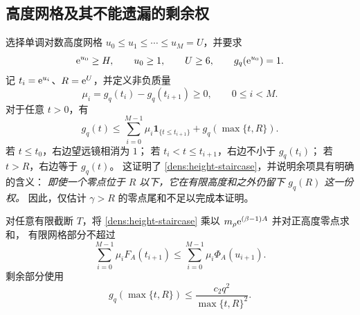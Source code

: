 \subsection{高度网格及其不能遗漏的剩余权}

选择单调对数高度网格
$u_0\leq u_1\leq\cdots\leq u_M=U$，并要求
\begin{equation}\label{dens:height-conditions}
 \mathrm e^{u_0}\geq H,\qquad u_0\geq1,\qquad U\geq6,\qquad
 g_q(\mathrm e^{u_0})=1.
\end{equation}
记 $t_i=\mathrm e^{u_i}$、$R=\mathrm e^U$，并定义非负质量
\begin{equation}\label{dens:mu}
 \mu_i=g_q(t_i)-g_q(t_{i+1})\geq0,\qquad 0\leq i<M.
\end{equation}
对于任意 $t>0$，有
\begin{equation}\label{dens:height-staircase}
 g_q(t)\leq
 \sum_{i=0}^{M-1}\mu_i\mathbf{1}_{\{t\leq t_{i+1}\}}
        +g_q(\max\{t,R\}).
\end{equation}
若 $t\leq t_0$，右边望远镜相消为 $1$；
若 $t_i<t\leq t_{i+1}$，右边不小于 $g_q(t_i)$；
若 $t>R$，右边等于 $g_q(t)$。
这证明了 \eqref{dens:height-staircase}，并说明余项具有明确的含义：
\emph{即使一个零点位于 $R$ 以下，它在有限高度和之外仍留下
$g_q(R)$ 这一份权。}
因此，仅估计 $\gamma>R$ 的零点尾和不足以完成本证明。

对任意有限截断 $T$，将 \eqref{dens:height-staircase}
乘以 $m_\rho\mathrm e^{(\beta-1)A}$ 并对正高度零点求和，
有限网格部分不超过
\[
 \sum_{i=0}^{M-1}\mu_i F_A(t_{i+1})
 \leq\sum_{i=0}^{M-1}\mu_i\Phi_A(u_{i+1}).
\]
剩余部分使用
\begin{equation}\label{dens:quadratic-residual}
 g_q(\max\{t,R\})\leq
             \frac{c_2q^2}{\max\{t,R\}^2}.
\end{equation}

